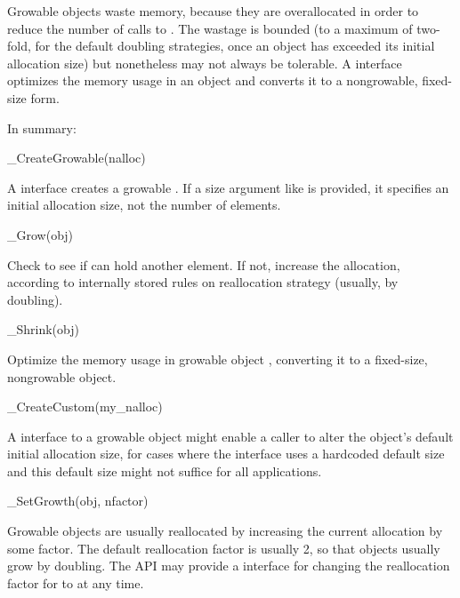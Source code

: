 Growable objects waste memory, because they are overallocated in order
to reduce the number of calls to .  The wastage is
bounded (to a maximum of two-fold, for the default doubling
strategies, once an object has exceeded its initial allocation size)
but nonetheless may not always be tolerable.  A 
interface optimizes the memory usage in an object and converts it to a
nongrowable, fixed-size form. 

In summary: 

\begin{sreapi}
\hypertarget{ifc:CreateGrowable}
{\item[\_CreateGrowable(nalloc)]}

A  interface creates a growable
. If a size argument like  is provided, it
specifies an initial allocation size, not the number of elements.

\hypertarget{ifc:Grow}
{\item[\_Grow(obj)]}

Check to see if  can hold another element. If not, increase
the allocation, according to internally stored rules on reallocation
strategy (usually, by doubling).

\hypertarget{ifc:Shrink}
{\item[\_Shrink(obj)]}

Optimize the memory usage in growable object , converting
it to a fixed-size, nongrowable object.

\hypertarget{ifc:CreateCustom}
{\item[\_CreateCustom(my\_nalloc)]}

A  interface to a growable object might enable
a caller to alter the object's default initial allocation size, for
cases where the  interface uses a hardcoded default
size and this default size might not suffice for all applications.

\hypertarget{ifc:SetGrowth}
{\item[\_SetGrowth(obj, nfactor)]}

Growable objects are usually reallocated by increasing the current
allocation by some factor. The default reallocation factor is usually
2, so that objects usually grow by doubling. The API may provide a
 interface for changing the reallocation factor
for  to  at any time.
\end{sreapi}



